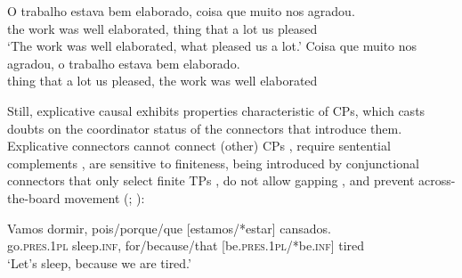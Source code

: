 \documentclass[output=paper,colorlinks,citecolor=brown,
]{langscibook}
\begin{document}
\ea \label{ex:matos:trabalho-elaborado}
 \ea \label{ex:matos:trabalho-elaborado-ok}
 \gll O trabalho estava bem elaborado, coisa que muito nos agradou.\\
      the work was well elaborated, thing that {a lot} us pleased\\
 \glt ‘The work was well elaborated, what pleased us a lot.’
 \ex \label{ex:matos:trabalho-elaborado-bad}
 \gll {*} Coisa que muito nos agradou, o trabalho estava bem elaborado.\\
      {} thing that {a lot} us pleased, the work was well elaborated\\
 \z
\z 

Still, explicative causal exhibits properties characteristic of CPs, which casts doubts on the coordinator status of the connectors that introduce them. Explicative connectors cannot connect (other) CPs , require sentential complements , are sensitive to finiteness, being introduced by conjunctional connectors that only select finite TPs , do not allow gapping , and prevent across-the-board movement  (\citealt{matos_coordenacao_2004}; \citealt{colaco_explicative_2016}):

 \label{ex:matos:eles-chegaram}
\z 

\citep[49]{lobo_aspectos_2003} \label{ex:matos:joao-luz-acesa}
\z 

\ea \label{ex:matos:vamos-dormir}
\gll Vamos dormir, pois/porque/que [estamos/*estar] cansados.\\
	 go.\textsc{pres}.\textsc{1pl} sleep.\textsc{inf}, for/because/that [be.\textsc{pres}.\textsc{1pl}/*be.\textsc{inf}] tired\\
\glt ‘Let’s sleep, because we are tired.’
\z 

 \label{ex:matos:estao-em-casa}
\z 
\end{document}
